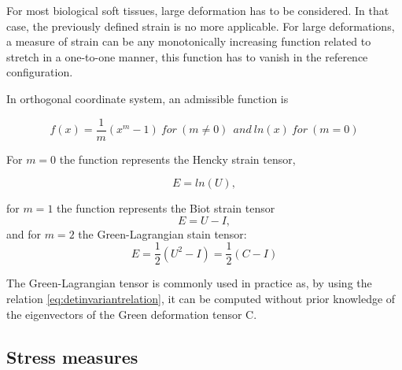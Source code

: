 For most biological soft tissues, large deformation has to be considered. In that case, the previously defined strain is no more applicable. For large deformations, a measure of strain can be any monotonically increasing function related to stretch in a one-to-one manner, this function has to vanish in the reference configuration.

In orthogonal coordinate system, an admissible function is 

\begin{equation}
f(x) = \frac{1}{m}(x^m-1) \ for \ (m \neq 0)\  \ and \ ln(x) \ for \ (m=0)
\end{equation}


For $m = 0$ the function represents the Hencky strain tensor, 

\begin{equation}
E = ln(U), 
\end{equation}

for $m=1$  the function represents the Biot strain tensor 
\begin{equation}
E = U-I,
\end{equation}
and for $m=2$ the Green-Lagrangian stain tensor:
\begin{equation}
E = \frac{1}{2}(U^2-I) =  \frac{1}{2}(C-I)
\end{equation}

The Green-Lagrangian tensor is commonly used in practice as, by using the relation \ref{eq:detinvariantrelation}, it can be computed without prior knowledge of the eigenvectors of the Green deformation tensor C.
%

\subsection{Stress measures}%

